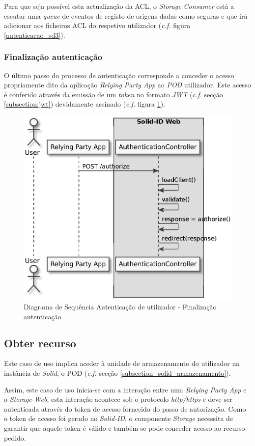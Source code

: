 Para que seja possível esta actualização da ACL, o \emph{Storage Consumer} está a escutar uma \emph{queue} de eventos de registo de origens dadas como seguras e que irá adicionar aos ficheiros ACL do respetivo utilizador (\emph{c.f.} figura \ref{autenticacao_sd3}).

\subsubsection{Finalização autenticação}
O último passo do processo de autenticação corresponde a conceder o acesso propriamente dito da aplicação \emph{Relying Party App} ao \emph{POD} utilizador. Este acesso é conferido através da emissão de um \emph{token} no formato \emph{JWT} (\emph{c.f.} secção \ref{subsection:jwt}) devidamente assinado (\emph{c.f.} figura \ref{autenticacao_sd4}).

\begin{figure}[H]
    \begin{center}
    \includegraphics[width=0.6 \textwidth]{figures/authentication_sd_4.eps}
    \caption{Diagrama de Sequência Autenticação de utilizador - Finalização autenticação}
    \label{autenticacao_sd4}
    \end{center}
\end{figure}

\subsection{Obter recurso}
Este caso de uso implica aceder à unidade de armazenamento do utilizador na instância de \emph{Solid}, o POD (\emph{c.f.} secção \ref{subsection_solid_armazenamento}). 

Assim, este caso de uso inicia-se com a interação entre uma \emph{Relying Party App} e o \emph{Storage-Web}, esta interação acontece sob o protocolo \emph{http/https} e deve ser autenticada através do token de acesso fornecido do passo de autorização.
Como o token de acesso foi gerado no \emph{Solid-ID}, o componente \emph{Storage} necessita de garantir que aquele token é válido e também se pode conceder acesso ao recurso pedido.

